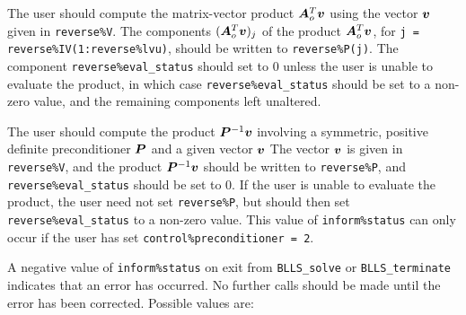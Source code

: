 \documentclass{galahad}
\newcommand{\packagename}{BLLS}
\begin{document}
\begin{description}
 The user should compute the matrix-vector product ${\bm{A}}_o^T {\bm{v}}$
     using the vector ${\bm{v}}$ given in {\tt reverse\%V}. The components
     $({\bm{A}}_o^T {\bm{v}})_j$ of the product ${\bm{A}}_o^T {\bm{v}}$, for
     {\tt j = reverse\%IV(1:reverse\%lvu)},
     should be written to {\tt reverse\%P(j)}.
     The component {\tt reverse\%eval\_status} should set to 0 unless the
     user is unable to evaluate the product, in which case
     {\tt reverse\%eval\_status} should be set to a non-zero value, and the
      remaining components left unaltered.

 The user should compute the product ${\bm{P}}^{-1} {\bm{v}}$
     involving a symmetric, positive definite preconditioner ${\bm{P}}$ 
     and a given vector ${\bm{v}}$
     The vector ${\bm{v}}$ is given in {\tt reverse\%V}, and the
     product ${\bm{P}}^{-1} {\bm{v}}$ should be written to {\tt reverse\%P},
     and  {\tt reverse\%eval\_status} should be set to 0.
     If the user is unable to evaluate the product,
     the user need not set {\tt reverse\%P}, but
     should then set {\tt reverse\%eval\_status} to a non-zero value.
     This value of {\tt inform\%status} can only occur if the user 
     has set {\tt control\%preconditioner = 2}.

\end{description}


\galerrors
A negative value of {\tt inform\%status} on exit from
{\tt \packagename\_solve}
or
{\tt \packagename\_terminate}
indicates that an error has occurred. No further calls should be made
until the error has been corrected. Possible values are:
\end{document}
